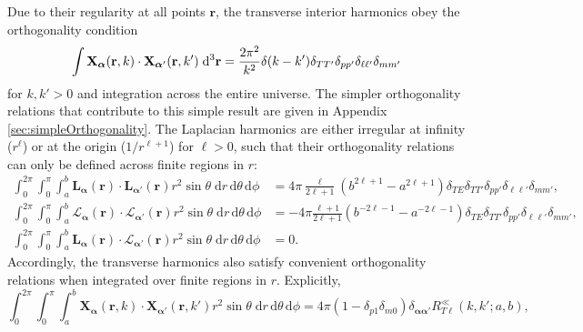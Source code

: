 \documentclass{article}
\begin{document}
Due to their regularity at all points $\mathbf{r}$, the transverse interior harmonics obey the orthogonality condition
\begin{equation}\label{eq:vectorSphericalHarmonicOrthogonality}
\int \mathbf{X}_{\bm{\alpha}}(\mathbf{r},k)\cdot\mathbf{X}_{\bm{\alpha}'}(\mathbf{r},k')\;\mathrm{d}^3\mathbf{r} = \frac{2\pi^2}{k^2}\delta(k - k')\delta_{TT'}\delta_{pp'}\delta_{\ell\ell'}\delta_{mm'}\\
\end{equation}
for $k,k' > 0$ and integration across the entire universe. The simpler orthogonality relations that contribute to this simple result are given in Appendix \ref{sec:simpleOrthogonality}. The Laplacian harmonics are either irregular at infinity ($r^\ell$) or at the origin ($1/r^{\ell + 1}$) for $\ell > 0$, such that their orthogonality relations can only be defined across finite regions in $r$:
\begin{equation}\label{eq:laplacianHarmonicOrthogonality}
\begin{split}
\int_0^{2\pi}\int_0^\pi\int_a^b\mathbf{L}_{\bm{\alpha}}(\mathbf{r})\cdot\mathbf{L}_{\bm{\alpha}'}(\mathbf{r})r^2\sin\theta\;\mathrm{d}r\,\mathrm{d}\theta\,\mathrm{d}\phi &= 4\pi\frac{\ell}{2\ell + 1}\left(b^{2\ell + 1} - a^{2\ell + 1}\right)\delta_{T\!E}\delta_{TT'}\delta_{pp'}\delta_{\ell\ell'}\delta_{mm'},\\
\int_0^{2\pi}\int_0^\pi\int_a^b\bm{\mathcal{L}}_{\bm{\alpha}}(\mathbf{r})\cdot\bm{\mathcal{L}}_{\bm{\alpha}'}(\mathbf{r})r^2\sin\theta\;\mathrm{d}r\,\mathrm{d}\theta\,\mathrm{d}\phi &= -4\pi\frac{\ell + 1}{2\ell + 1}\left(b^{-2\ell - 1} - a^{-2\ell - 1}\right)\delta_{TE}\delta_{TT'}\delta_{pp'}\delta_{\ell\ell'}\delta_{mm'},\\
\int_0^{2\pi}\int_0^\pi\int_a^b\mathbf{L}_{\bm{\alpha}}(\mathbf{r})\cdot\bm{\mathcal{L}}_{\bm{\alpha}'}(\mathbf{r})r^2\sin\theta\;\mathrm{d}r\,\mathrm{d}\theta\,\mathrm{d}\phi &= 0.
\end{split}
\end{equation}
Accordingly, the transverse harmonics also satisfy convenient orthogonality relations when integrated over finite regions in $r$. Explicitly,
\begin{equation}\label{eq:vectorSphericalHarmonicOrthogonalityConditionFinite}
\int_0^{2\pi}\int_0^\pi\int_a^b\mathbf{X}_{\bm{\alpha}}(\mathbf{r},k)\cdot\mathbf{X}_{\bm{\alpha}'}(\mathbf{r},k')r^2\sin\theta\;\mathrm{d}r\,\mathrm{d}\theta\,\mathrm{d}\phi = 4\pi(1 - \delta_{p1}\delta_{m0})\delta_{\bm{\alpha}\bm{\alpha}'}R_{T\ell}^{\ll}(k,k';a,b),%
\end{equation}
\end{document}
